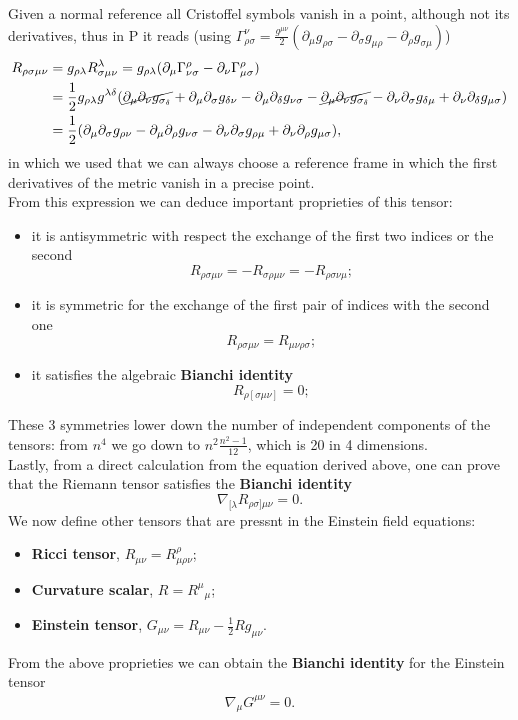 Given a normal reference all Cristoffel symbols vanish in a point, although not its derivatives, thus in P it reads (using $\Gamma_{\rho\sigma}^\nu=\frac{g^{\mu\nu}}{2}(\partial_\mu g_{\rho\sigma}-\partial_\sigma g_{\mu\rho}-\partial_\rho g_{\sigma\mu})$) \begin{align*}
    R_{\rho\sigma\mu\nu}&=g_{\rho\lambda}R^\lambda_{\sigma\mu\nu}=g_{\rho\lambda}(\partial_\mu \Gamma^\rho_{\nu\sigma} -\partial_\nu \Gamma^\rho_{\mu\sigma})\\&=\frac{1}{2}g_{\rho\lambda}g^{\lambda\delta}(\cancel{\partial_\mu \partial_\nu g_{\sigma_\delta}}+\partial_\mu\partial_\sigma g_{\delta\nu}-\partial_\mu\partial_\delta g_{\nu\sigma}-\cancel{\partial_\mu \partial_\nu g_{\sigma_\delta}}-\partial_\nu\partial_\sigma g_{\delta\mu}+\partial_\nu\partial_\delta g_{\mu\sigma})\\&=\frac{1}{2}(\partial_{\mu}\partial_{\sigma}g_{\rho\nu}-\partial_{\mu}\partial_{\rho}g_{\nu\sigma}-\partial_{\nu}\partial_{\sigma}g_{\rho\mu}+\partial_{\nu}\partial_{\rho}g_{\mu\sigma}),
\end{align*}
in which we used that we can always choose a reference frame in which the first derivatives of the metric vanish in a precise point.\\
From this expression we can deduce important proprieties of this tensor:
\begin{itemize}
    \item it is antisymmetric with respect the exchange of the first two indices or the second $$\boxed{R_{\rho\sigma\mu\nu}=-R_{\sigma\rho\mu\nu}=-R_{\rho\sigma\nu\mu}};$$
    \item it is symmetric for the exchange of the first pair of indices with the second one $$\boxed{R_{\rho\sigma\mu\nu} =R_{\mu\nu\rho\sigma}}; $$
    \item it satisfies the algebraic \textbf{Bianchi identity} $$\boxed{R_{\rho[\sigma\mu\nu]}=0};$$
\end{itemize}
These 3 symmetries lower down the number of independent components of the tensors: from $n^4$ we go down to $n^2\frac{n^2-1}{12}$, which is 20 in 4 dimensions.\\
Lastly, from a direct calculation from the equation derived above, one can prove that the Riemann tensor satisfies the \textbf{Bianchi identity} $$\boxed{\nabla_{[\lambda}R_{\rho\sigma]\mu\nu}=0}.$$
We now define other tensors that are pressnt in the Einstein field equations:
\begin{itemize}
    \item \textbf{Ricci tensor}, $R_{\mu\nu}=R^{\rho}_{\mu\rho\nu}$;
    \item \textbf{Curvature scalar}, $R=R^\mu\phantom{}_\mu$;
    \item \textbf{Einstein tensor}, $G_{\mu\nu}=R_{\mu\nu}-\frac{1}{2}Rg_{\mu\nu}$.
\end{itemize}  
From the above proprieties we can obtain the \textbf{Bianchi identity} for the Einstein tensor
\begin{align*}
    \boxed{\nabla_\mu G^{\mu\nu}=0}.
\end{align*}